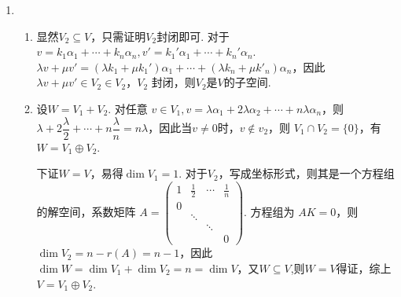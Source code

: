 \begin{enumerate}
    \item \begin{enumerate}
              \item 显然$V_2\subseteq V$，只需证明$V_2$封闭即可. 对于$v=k_1\alpha_1+\cdots+k_n\alpha_n,v'=k_1'\alpha_1+\cdots+k_n'\alpha_n$. $\lambda v+\mu v'=(\lambda k_1+\mu k_1')\alpha_1+\cdots+(\lambda k_n+\mu k'_n)\alpha_n$，因此  $\lambda v+\mu v'\in V_2\in V_2$，$V_2$ 封闭，则$V_2$是$V$的子空间.

              \item 设$W=V_1+V_2$. 对任意 $v\in V_1,v=\lambda \alpha_1+2\lambda\alpha_2+\cdots+n\lambda\alpha_n$，则 $\lambda+2\dfrac{\lambda}2+\allowbreak\cdots+n\dfrac{\lambda}n=n\lambda$，因此当$v\ne 0$时，$v\not\in v_2$，则 $V_1\cap V_2=\{0\}$，有$W=V_1\oplus V_2$.

                    下证$W=V$，易得$\dim V_1=1$. 对于$V_2$，写成坐标形式，则其是一个方程组的解空间，系数矩阵 $A=\begin{pmatrix}
                            1 & \frac 12 & \cdots & \frac 1n \\
                            0 &          &        &          \\
                              & \ddots   &        &          \\
                              &          & \ddots &          \\
                              &          &        & 0
                        \end{pmatrix}$. 方程组为 $AK=0$，则 $\dim V_2=n-r(A)=n-1$，因此$\dim W=\dim V_1+\dim V_2=n=\dim V$，又$W\subseteq V$,则$W=V$得证，综上$V=V_1\oplus V_2$.
          \end{enumerate}


\end{enumerate}
